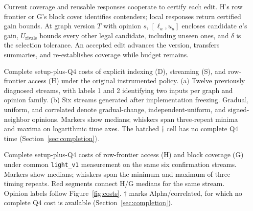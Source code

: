 \caption{Current coverage and reusable responses cooperate to certify each edit. H's row frontier or G's block cover identifies contenders; local responses return certified gain bounds. At graph version $T$ with opinion $s$, $[\ell_a,u_a]$ encloses candidate $a$'s gain, $U_{\mathrm{rivals}}$ bounds every other legal candidate, including unseen ones, and $\delta$ is the selection tolerance. An accepted edit advances the version, transfers summaries, and re-establishes coverage while budget remains.}

\caption{Complete setup-plus-Q4 costs of explicit indexing (D), streaming (S), and row-frontier access (H) under the original instrumented policy. (a) Twelve previously diagnosed streams, with labels 1 and 2 identifying two inputs per graph and opinion family. (b) Six streams generated after implementation freezing. Gradual, uniform, and correlated denote gradual-change, independent-uniform, and signed-neighbor opinions. Markers show medians; whiskers span three-repeat minima and maxima on logarithmic time axes. The hatched $\dagger$ cell has no complete Q4 time (Section~\ref{sec:completion}).}

\caption{Complete setup-plus-Q4 costs of row-frontier access (H) and block coverage (G) under common \texttt{light\_v1} measurement on the same six confirmation streams. Markers show medians; whiskers span the minimum and maximum of three timing repeats. Red segments connect H/G medians for the same stream. Opinion labels follow Figure~\ref{fig:costs}. $\dagger$ marks Alpha/correlated, for which no complete Q4 cost is available (Section~\ref{sec:completion}).}
